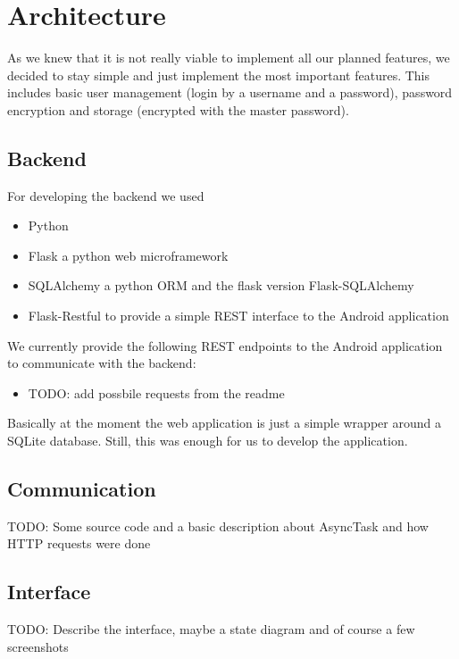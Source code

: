\documentclass{report}
\begin{document}
\section{Architecture}

As we knew that it is not really viable to implement all our planned features, we decided to stay simple and just implement the most important features. This includes basic user management (login by a username and a password), password encryption and storage (encrypted with the master password).

\subsection{Backend}
For developing the backend we used
\begin{itemize}
	\item Python \cite{Python}
	\item Flask \cite{Flask} a python web microframework
	\item SQLAlchemy \cite{SQLAlchemy} a python ORM and the flask version Flask-SQLAlchemy \cite{FlaskSQLAlchemy}
	\item Flask-Restful \cite{Flask-Restful} to provide a simple REST interface to the Android application
\end{itemize}

We currently provide the following REST endpoints to the Android application to communicate with the backend:

\begin{itemize}
	\item TODO: add possbile requests from the readme
\end{itemize}

Basically at the moment the web application is just a simple wrapper around a SQLite database. Still, this was enough for us to develop the application.

\subsection{Communication}

TODO: Some source code and a basic description about AsyncTask and how HTTP requests were done

\subsection{Interface}

TODO: Describe the interface, maybe a state diagram and of course a few screenshots
\end{document}
